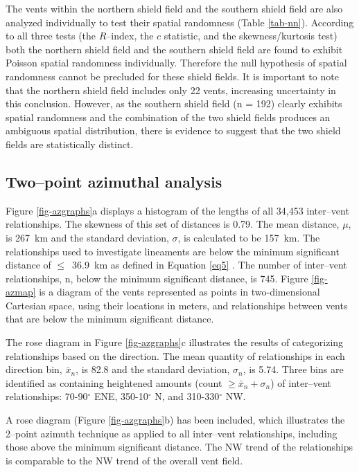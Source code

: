 The vents within the northern shield field and the southern shield field are also analyzed individually to test their spatial randomness (Table \ref{tab-nn}). According to all three tests (the $R$--index, the $c$ statistic, and the skewness/kurtosis test) both the northern shield field and the southern shield field are found to exhibit Poisson spatial randomness individually. Therefore the null hypothesis of spatial randomness cannot be precluded for these shield fields. It is important to note that the northern shield field includes only 22 vents, increasing uncertainty in this conclusion. However, as the  southern shield field (n = 192) clearly exhibits spatial randomness and the combination of the two shield fields produces an ambiguous spatial distribution, there is evidence to suggest that the two shield fields are statistically distinct.

\subsection{Two--point azimuthal analysis}

Figure \ref{fig-azgraphs}a displays a histogram of the lengths of all 34,453 inter--vent relationships. The skewness of this set of distances is 0.79. The mean distance, $\mu$, is 267~km and the standard deviation, $\sigma$, is calculated to be 157~km. The relationships used to investigate lineaments are below the minimum significant distance of $\le$~36.9~km as defined in Equation \ref{eq5} \citep{Cebria2011}. The number of inter--vent relationships, n, below the minimum significant distance, is 745. Figure \ref{fig-azmap} is a diagram of the vents represented as points in two-dimensional Cartesian space, using their locations in meters, and relationships between vents that are below the minimum significant distance.

The rose diagram in Figure \ref{fig-azgraphs}c illustrates the results of categorizing relationships based on the direction. The mean quantity of relationships in each direction bin, $\bar{x}_n$, is 82.8 and the standard deviation, $\sigma_n$, is 5.74. Three bins are identified as containing heightened amounts (count $\ge \bar{x}_n + \sigma_n$) of inter--vent relationships: 70-90$^{\circ}$ ENE, 350-10$^{\circ}$ N, and 310-330$^{\circ}$ NW.

A rose diagram (Figure \ref{fig-azgraphs}b) has been included, which illustrates the 2--point azimuth technique as applied to all inter--vent relationships, including those above the minimum significant distance. The NW trend of the relationships is comparable to the NW trend of the overall vent field.

